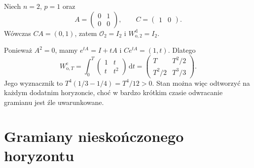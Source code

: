 \begin{przyklad}
\label{prz:lin27-two-gramians}
Niech \(n=2\), \(p=1\)
oraz
\[
 A=\begin{pmatrix}0&1\\0&0\end{pmatrix},
 \qquad C=\begin{pmatrix}1&0\end{pmatrix}.
\]
Wówczas \(CA=(0,1)\), zatem
\(\mathcal O_2=I_2\)
i
\(W_{\mathrm o,2}^{\mathrm d}=I_2\).

Ponieważ \(A^2=0\),
mamy \(e^{tA}=I+tA\) i
\(Ce^{tA}=(1,t)\).
Dlatego
\[
 W_{\mathrm o,T}^{\mathrm c}
 =\int_0^T
 \begin{pmatrix}1&t\\t&t^2\end{pmatrix}
 \,\mathrm dt
 =\begin{pmatrix}
    T&T^2/2\\
    T^2/2&T^3/3
   \end{pmatrix}.
\]
Jego wyznacznik to
\(T^4(1/3-1/4)=T^4/12>0\).
Stan można więc odtworzyć
na każdym dodatnim horyzoncie,
choć w bardzo krótkim czasie
odwracanie gramianu jest źle
uwarunkowane.
\end{przyklad}

\section{Gramiany nieskończonego horyzontu}
\label{sec:lin27-infinite}

